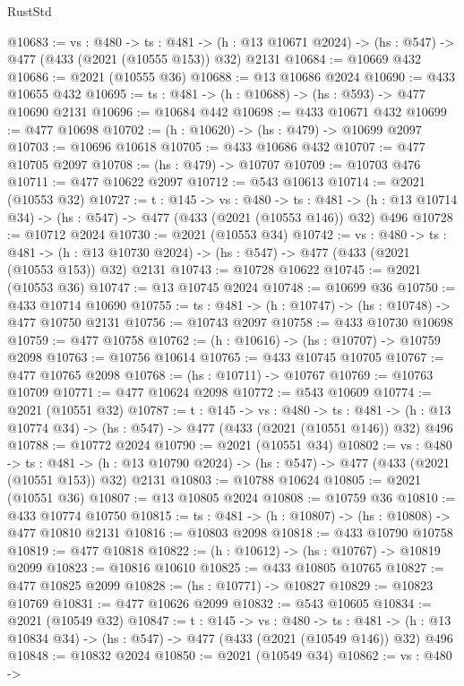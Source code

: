 \begin{lexlean}{RustStd}
\begin{coremodule}
@10683 := {vs : @480} ->
  {ts : @481} ->
  (h : @13 @10671 @2024) -> (hs : @547) -> @477 (@433 (@2021 (@10555 @153)) @32) @2131
@10684 := @10669 @432
@10686 := @2021 (@10555 @36)
@10688 := @13 @10686 @2024
@10690 := @433 @10655 @432
@10695 := {ts : @481} -> (h : @10688) -> (hs : @593) -> @477 @10690 @2131
@10696 := @10684 @442
@10698 := @433 @10671 @432
@10699 := @477 @10698
@10702 := (h : @10620) -> (hs : @479) -> @10699 @2097
@10703 := @10696 @10618
@10705 := @433 @10686 @432
@10707 := @477 @10705 @2097
@10708 := (hs : @479) -> @10707
@10709 := @10703 @476
@10711 := @477 @10622 @2097
@10712 := @543 @10613
@10714 := @2021 (@10553 @32)
@10727 := {t : @145} ->
  {vs : @480} ->
  {ts : @481} -> (h : @13 @10714 @34) -> (hs : @547) -> @477 (@433 (@2021 (@10553 @146)) @32) @496
@10728 := @10712 @2024
@10730 := @2021 (@10553 @34)
@10742 := {vs : @480} ->
  {ts : @481} ->
  (h : @13 @10730 @2024) -> (hs : @547) -> @477 (@433 (@2021 (@10553 @153)) @32) @2131
@10743 := @10728 @10622
@10745 := @2021 (@10553 @36)
@10747 := @13 @10745 @2024
@10748 := @10699 @36
@10750 := @433 @10714 @10690
@10755 := {ts : @481} -> (h : @10747) -> (hs : @10748) -> @477 @10750 @2131
@10756 := @10743 @2097
@10758 := @433 @10730 @10698
@10759 := @477 @10758
@10762 := (h : @10616) -> (hs : @10707) -> @10759 @2098
@10763 := @10756 @10614
@10765 := @433 @10745 @10705
@10767 := @477 @10765 @2098
@10768 := (hs : @10711) -> @10767
@10769 := @10763 @10709
@10771 := @477 @10624 @2098
@10772 := @543 @10609
@10774 := @2021 (@10551 @32)
@10787 := {t : @145} ->
  {vs : @480} ->
  {ts : @481} -> (h : @13 @10774 @34) -> (hs : @547) -> @477 (@433 (@2021 (@10551 @146)) @32) @496
@10788 := @10772 @2024
@10790 := @2021 (@10551 @34)
@10802 := {vs : @480} ->
  {ts : @481} ->
  (h : @13 @10790 @2024) -> (hs : @547) -> @477 (@433 (@2021 (@10551 @153)) @32) @2131
@10803 := @10788 @10624
@10805 := @2021 (@10551 @36)
@10807 := @13 @10805 @2024
@10808 := @10759 @36
@10810 := @433 @10774 @10750
@10815 := {ts : @481} -> (h : @10807) -> (hs : @10808) -> @477 @10810 @2131
@10816 := @10803 @2098
@10818 := @433 @10790 @10758
@10819 := @477 @10818
@10822 := (h : @10612) -> (hs : @10767) -> @10819 @2099
@10823 := @10816 @10610
@10825 := @433 @10805 @10765
@10827 := @477 @10825 @2099
@10828 := (hs : @10771) -> @10827
@10829 := @10823 @10769
@10831 := @477 @10626 @2099
@10832 := @543 @10605
@10834 := @2021 (@10549 @32)
@10847 := {t : @145} ->
  {vs : @480} ->
  {ts : @481} -> (h : @13 @10834 @34) -> (hs : @547) -> @477 (@433 (@2021 (@10549 @146)) @32) @496
@10848 := @10832 @2024
@10850 := @2021 (@10549 @34)
@10862 := {vs : @480} ->

\end{coremodule}
\end{lexlean}
